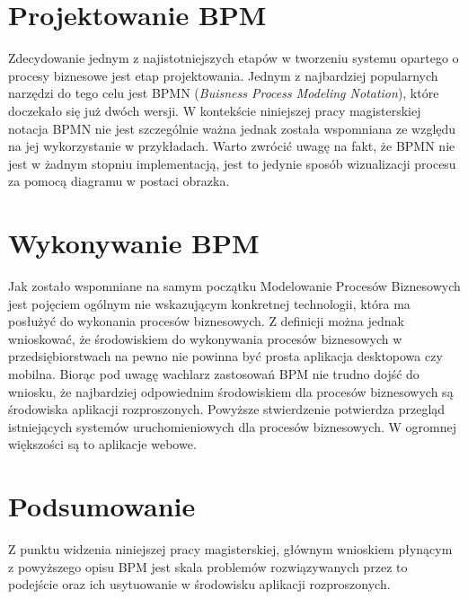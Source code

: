 
\section{Projektowanie BPM}
\label{sec:projektowanieBPM}

Zdecydowanie jednym z najistotniejszych etapów w tworzeniu systemu opartego o procesy biznesowe jest etap projektowania. Jednym z najbardziej popularnych narzędzi do tego celu jest BPMN (\textit{Buisness Process Modeling Notation}), które doczekało się już dwóch wersji. W kontekście niniejszej pracy magisterskiej notacja BPMN nie jest szczególnie ważna jednak została wspomniana ze względu na jej wykorzystanie w przykładach. Warto zwrócić uwagę  na fakt, że BPMN nie jest w żadnym stopniu implementacją, jest to jedynie sposób wizualizacji procesu za pomocą diagramu w postaci obrazka.


\section{Wykonywanie BPM}
\label{sec:wykonywanieBPM}

Jak zostało wspomniane na samym początku Modelowanie Procesów Biznesowych jest pojęciem ogólnym nie wskazującym konkretnej technologii, która ma posłużyć do wykonania procesów biznesowych. Z definicji można jednak wnioskować, że środowiskiem do wykonywania procesów biznesowych w przedsiębiorstwach na pewno nie powinna być prosta aplikacja desktopowa czy mobilna. Biorąc pod uwagę wachlarz zastosowań BPM nie trudno dojść do wniosku, że najbardziej odpowiednim środowiskiem dla procesów biznesowych są środowiska aplikacji rozproszonych. 
Powyższe stwierdzenie potwierdza przegląd istniejących systemów uruchomieniowych dla procesów biznesowych. W ogromnej większości są to aplikacje webowe. 


\section{Podsumowanie}
\label{sec:podsumowanieBPM}

Z punktu widzenia niniejszej pracy magisterskiej, głównym wnioskiem płynącym z powyższego opisu BPM jest skala problemów rozwiązywanych przez to podejście oraz ich usytuowanie w środowisku aplikacji rozproszonych. 
